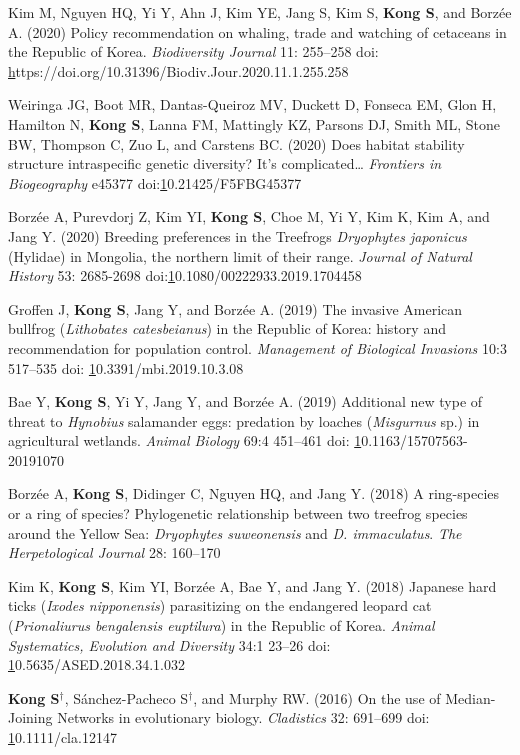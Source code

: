 \documentclass[11pt]{article}
\begin{document}
\begin{etaremune}
\item Kim M, Nguyen HQ, Yi Y, Ahn J, Kim YE, Jang S, Kim S, \textbf{Kong S}, and Borzée A. (2020) Policy recommendation on whaling, trade and watching of cetaceans in the Republic of Korea. \textit{Biodiversity Journal} 11: 255–258 doi: \href{https://doi.org/10.31396/Biodiv.Jour.2020.11.1.255.258}https://doi.org/10.31396/Biodiv.Jour.2020.11.1.255.258
\item Weiringa JG, Boot MR,  Dantas-Queiroz MV, Duckett D, Fonseca EM, Glon H, Hamilton N, \textbf{Kong S}, Lanna FM, Mattingly KZ, Parsons DJ, Smith ML, Stone BW, Thompson C, Zuo L, and Carstens BC. (2020) Does habitat stability structure intraspecific genetic diversity? It’s complicated… \textit{Frontiers in Biogeography} e45377 doi:\href{https://doi.org/10.21425/F5FBG45377}10.21425/F5FBG45377
\item Borzée A, Purevdorj Z, Kim YI, \textbf{Kong S}, Choe M, Yi Y, Kim K, Kim A, and Jang Y. (2020) Breeding preferences in the Treefrogs \textit{Dryophytes japonicus} (Hylidae) in Mongolia, the northern limit of their range. \textit{Journal of Natural History} 53: 2685-2698 doi:\href{10.1080/00222933.2019.1704458}10.1080/00222933.2019.1704458
\item Groffen J, \textbf{Kong S}, Jang Y, and Borzée A. (2019) The invasive American bullfrog (\textit{Lithobates catesbeianus}) in the Republic of Korea: history and recommendation for population control. \textit{Management of Biological Invasions} 10:3 517–535 doi: \href{10.3391/mbi.2019.10.3.08}10.3391/mbi.2019.10.3.08
\item Bae Y, \textbf{Kong S}, Yi Y, Jang Y, and Borzée A. (2019) Additional new type of threat to \textit{Hynobius} salamander eggs: predation by loaches (\textit{Misgurnus} sp.) in agricultural wetlands. \textit{Animal Biology} 69:4 451–461 doi: \href{https://doi.org/10.1163/15707563-20191070}10.1163/15707563-20191070
\item Borzée A,\textbf{ Kong S}, Didinger C, Nguyen HQ, and Jang Y. (2018) A ring-species or a ring of species? Phylogenetic relationship between two treefrog species around the Yellow Sea: \textit{Dryophytes suweonensis }and \textit{D. immaculatus}. \textit{The Herpetological Journal} 28: 160–170 
\item Kim K, \textbf{Kong S}, Kim YI, Borzée A, Bae Y, and Jang Y. (2018) Japanese hard ticks (\textit{Ixodes nipponensis}) parasitizing on the endangered leopard cat (\textit{Prionaliurus bengalensis euptilura}) in the Republic of Korea. \textit{Animal Systematics, Evolution and Diversity} 34:1 23–26 doi: \href{10.5635/ASED.2018.34.1.032}10.5635/ASED.2018.34.1.032
\item \textbf{Kong S}{$^\dag$}, Sánchez-Pacheco S{$^\dag$}, and Murphy RW. (2016) On the use of Median-Joining Networks in evolutionary biology. \textit{Cladistics} 32: 691–699 doi: \href{https://doi.org/10.1111/cla.12147}10.1111/cla.12147

\end{etaremune}
\end{document}
